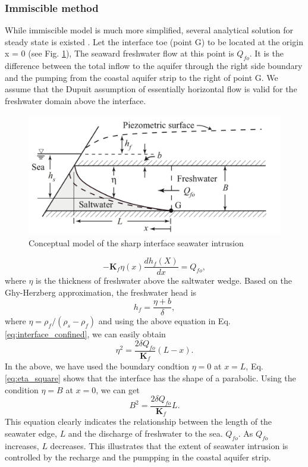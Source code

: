 \documentclass[review]{elsarticle}
\newcommand{\mbf}[1]{{\mathbf{#1}}}%
\begin{document}
\subsubsection{Immiscible method}
While immiscible model is much more simplified, several analytical solution for steady state is existed \cite{bear2010modeling}. Let the interface toe (point G) to be located at the origin x = 0 (see Fig. \ref{fig:seawater_analytical}), The seaward freshwater flow at this point is $Q_{fo}$. It is the difference between the total inflow to the aquifer through the right side boundary and the pumping from the coastal aquifer strip to the right of point G. We assume that the Dupuit assumption of essentially horizontal flow is valid for the freshwater domain above the interface.
\begin{figure}
\centering
\includegraphics[width=1.0\textwidth]{figures/seawater_analytical}
\caption{Conceptual model of the sharp interface seawater intrusion}
\label{fig:seawater_analytical}
\end{figure}
 
\begin{equation}\label{eq:interface_confined}
- \mbf{K}_f \eta(x) \frac{dh_f(X)}{dx} = Q_{fo},
\end{equation}  
where $\eta$ is the thickness of freshwater above the saltwater wedge. Based on the Ghy-Herzberg approximation, the freshwater head is 
\begin{equation}\label{freshwater_head}
h_f = \frac{\eta + b}{\delta},
\end{equation} 
where $\eta = \rho_f / (\rho_s - \rho_f) $ and using the above equation in Eq. \ref{eq:interface_confined}, we can easily obtain 
\begin{equation}\label{eq:eta_square}
\eta^2 = \frac{2\delta Q_{fo}}{\mbf{K}_f} (L - x).
\end{equation}
In the above, we have used the boundary condtion $\eta = 0$ at $x = L$, Eq. \ref{eq:eta_square} shows that the interface has the shape of a parabolic. Using the condition $\eta = B$ at $x = 0$, we can get
\begin{equation}\label{eq:B_square}
B^2 = \frac{2\delta Q_{fo}}{\mbf{K}_f}L.
\end{equation}
This equation clearly indicates the relationship between the length of the seawater edge, $L$ and the discharge of freshwater to the sea. $Q_{fo}$. As $Q_{fo}$ increases, $L$ decreases. This illustrates that the extent of seawater intrusion is controlled by the recharge and the pumpping in the coastal aquifer strip. \par
\end{document}
